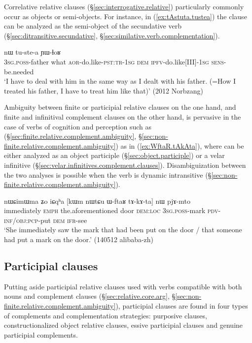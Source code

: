 Correlative relative clauses (§\ref{sec:interrogative.relative}) particularly commonly occur as objects or semi-objects. For instance, in (\ref{ex:tAstuta.tustea}) the clause  can be analyzed as the semi-object of the secundative verb  (§\ref{sec:ditransitive.secundative}, §\ref{sec:similative.verb.complementation}).

\begin{exe}
	\ex \label{ex:tAstuta.tustea}
	 nɯ tu-ste-a ɲɯ-ɬoʁ \\
	\textsc{3sg}.\textsc{poss}-father what \textsc{aor}-do.like-\textsc{pst}:\textsc{tr}-\textsc{1sg} \textsc{dem} \textsc{ipfv}-do.like[III]-\textsc{1sg} \textsc{sens}-be.needed \\
	\glt `I have to deal with him in the same way as I dealt with his father. (=How I treated his father, I have to treat him like that)' (2012 Norbzang)
\end{exe}

Ambiguity between finite or participial relative clauses on the one hand, and finite and infinitival complement clauses on the other hand, is pervasive in the case of verbs of cognition and perception such as  (§\ref{sec:finite.relative.complement.ambiguity}, §\ref{sec:non-finite.relative.complement.ambiguity}) as in (\ref{ex:WftaR.tAkAta}), where  can be either analyzed as an object participle (§\ref{sec:object.participle}) or a velar infinitive (§\ref{sec:velar.infinitives.complement.clauses}). Disambiguization between the two analyses is possible when the verb is dynamic intransitive (§\ref{sec:non-finite.relative.complement.ambiguity}).

\begin{exe}
	\ex  \label{ex:WftaR.tAkAta}
	\gll nɯɕimɯma ʑo iɕqʰa [kɯm nɯtɕu ɯ-ftaʁ tɤ-kɤ-ta] nɯ pjɤ-mto \\
	immediately \textsc{emph} the.aforementioned door \textsc{dem}:\textsc{loc} \textsc{3sg}.\textsc{poss}-mark \textsc{pdv}-\textsc{inf}/\textsc{obj}:\textsc{pcp}-put \textsc{dem} \textsc{ifr}-see \\
	\glt `She immediately saw the mark that had been put on the door / that someone had put a mark on the door.' (140512 alibaba-zh)
\end{exe}

\subsection{Participial clauses} \label{sec:participial.clause.complementation strategies}
Putting aside participial relative clauses used with verbs compatible with both nouns and complement clauses (§\ref{sec:relative.core.arg}, §\ref{sec:non-finite.relative.complement.ambiguity}), participial clauses are found in four types of complements and complementation strategies: purposive clauses, constructionalized object relative clauses, essive participial clauses and genuine participial complements.

